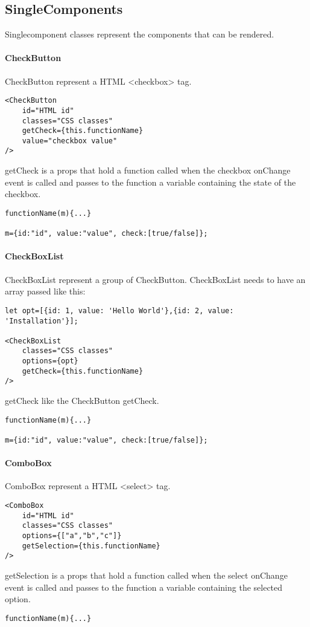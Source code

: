 \subsection{SingleComponents}
\begin{flushleft}
Singlecomponent classes represent the components that can be rendered.

\paragraph{CheckButton}
CheckButton represent a HTML <checkbox> tag.
\begin{verbatim}
<CheckButton
    id="HTML id"
    classes="CSS classes"
    getCheck={this.functionName}
    value="checkbox value"
/>
\end{verbatim}
getCheck is a props that hold a function called when the checkbox onChange event is called and passes to the function a variable containing the state of the checkbox.
\begin{verbatim}
functionName(m){...}

m={id:"id", value:"value", check:[true/false]};
\end{verbatim}

    \paragraph{CheckBoxList}
CheckBoxList represent a group of CheckButton.
CheckBoxList needs to have an array passed like this:
\begin{verbatim}
let opt=[{id: 1, value: 'Hello World'},{id: 2, value: 'Installation'}];

<CheckBoxList
    classes="CSS classes"
    options={opt}
    getCheck={this.functionName}
/>
\end{verbatim}
getCheck like the CheckButton getCheck.
\begin{verbatim}
functionName(m){...}

m={id:"id", value:"value", check:[true/false]};
\end{verbatim}

    \paragraph{ComboBox}
ComboBox represent a HTML <select> tag.
\begin{verbatim}
<ComboBox
    id="HTML id"
    classes="CSS classes"
    options={["a","b","c"]}
    getSelection={this.functionName}
/>
\end{verbatim}
getSelection is a props that hold a function called when the select onChange event is called and passes to the function a variable containing the selected option.
\begin{verbatim}
functionName(m){...}


\end{verbatim}
\end{flushleft}
